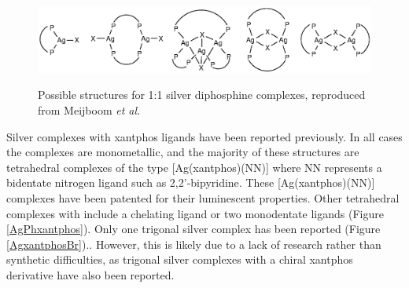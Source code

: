 \begin{figure}[h] 
\begin{center}
\vspace{0.5cm}
\includegraphics[scale=0.8]{../Figures/Possiblesilverstructures.eps}
\caption[1:1 silver diphosphine complexes]{Possible structures for 1:1 silver diphosphine complexes, reproduced from Meijboom \emph{et al.}\cite{Meijboom2009}}
\vspace{0.2cm}
\label{Silverstructures}
\end{center}
\end{figure}
\vspace{0.2cm}


Silver complexes with xantphos ligands have been reported previously.\cite{Malaise2006, Balakrishna2008}  In all cases the complexes are monometallic, and the majority of these structures are tetrahedral complexes of the type [Ag(xantphos)(NN)] where NN represents a bidentate nitrogen ligand such as 2,2'-bipyridine.  These [Ag(xantphos)(NN)] complexes have been patented for their luminescent properties.\cite{Kobayashi2010, Kobayashi2011a, Kobayashi2012a} Other tetrahedral complexes with \Phxantphos{} include a chelating ligand or two monodentate ligands (Figure \ref{AgPhxantphos}).  Only one trigonal silver \Phxantphos{} complex has been reported (Figure \ref{AgxantphosBr}).\cite{Kaltzoglou2007}.  However, this is likely due to a lack of research rather than synthetic difficulties, as trigonal silver complexes with a chiral xantphos derivative have also been reported.\cite{Malaise2006}

